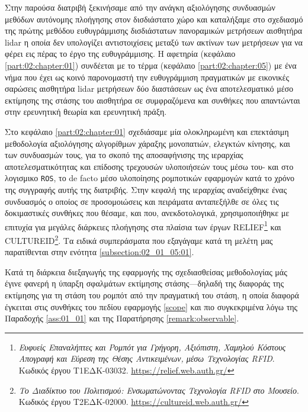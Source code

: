 Στην παρούσα διατριβή ξεκινήσαμε από την ανάγκη αξιολόγησης συνδυασμών μεθόδων
αυτόνομης πλοήγησης στον δισδιάστατο χώρο και καταλήξαμε στο σχεδιασμό της
πρώτης μεθόδου ευθυγράμμισης δισδιάστατων πανοραμικών μετρήσεων αισθητήρα lidar
η οποία δεν υπολογίζει αντιστοιχίσεις μεταξύ των ακτίνων των μετρήσεων για να
φέρει εις πέρας το έργο της ευθυγράμμισης. Η αφετηρία (κεφάλαιο
\ref{part:02:chapter:01}) συνδέεται με το τέρμα (κεφάλαιο
\ref{part:02:chapter:05}) με ένα νήμα που έχει ως κοινό παρονομαστή την
ευθυγράμμιση πραγματικών με εικονικές σαρώσεις αισθητήρα lidar μετρήσεων δύο
διαστάσεων ως ένα αποτελεσματικό μέσο εκτίμησης της στάσης του αισθητήρα σε
συμφραζόμενα και συνθήκες που απαντώνται στην ερευνητική θεωρία και ερευνητική
πράξη.

Στο κεφάλαιο \ref{part:02:chapter:01} σχεδιάσαμε μία ολοκληρωμένη και
επεκτάσιμη μεθοδολογία αξιολόγησης αλγορίθμων χάραξης μονοπατιών, ελεγκτών
κίνησης, και των συνδυασμών τους, για το σκοπό της αποσαφήνισης της ιεραρχίας
αποτελεσματικότητας και επίδοσης τρεχουσών υλοποιήσεών τους μέσω του- και στο
λογισμικο \texttt{ROS}, το de facto μέσο υλοποίησης ρομποτικών εφαρμογών κατά
το χρόνο της συγγραφής αυτής της διατριβής. Στην κεφαλή της ιεραρχίας
αναδείχθηκε ένας συνδυασμός ο οποίος σε προσομοιώσεις και πειράματα ανταπεξήλθε
σε όλες τις δοκιμαστικές συνθήκες που θέσαμε, και που, ανεκδοτολογικά,
χρησιμοποιήθηκε με επιτυχία για μεγάλες διάρκειες πλοήγησης στα πλαίσια των
έργων RELIEF\footnote{\textit{Ευφυείς Επαναλήπτες και Ρομπότ για Γρήγορη,
Αξιόπιστη, Χαμηλού Κόστους Απογραφή και Εύρεση της Θέσης Αντικειμένων, μέσω
Τεχνολογίας RFID}. Κωδικός έργου Τ1ΕΔΚ-03032.
\url{https://relief.web.auth.gr/}} και CULTUREID\footnote{\textit{Το Διαδίκτυο
του Πολιτισμού: Ενσωματώνοντας Τεχνολογία RFID στο Μουσείο}. Κωδικός έργου
Τ2ΕΔΚ-02000. \url{https://cultureid.web.auth.gr/}}. Τα ειδικά συμπεράσματα που
εξαγάγαμε κατά τη μελέτη μας παρατίθενται στην ενότητα
\ref{subsection:02_01_05:01}.

Κατά τη διάρκεια διεξαγωγής της εφαρμογής της σχεδιασθείσας μεθοδολογίας μάς
έγινε φανερή η ύπαρξη σφαλμάτων εκτίμησης στάσης---δηλαδή της διαφοράς της
εκτίμησης για τη στάση του ρομπότ από την πραγματική του στάση, η οποία διαφορά
έγκειται στις συνθήκες του πεδίου εφαρμογής \ref{scope} και πιο συγκεκριμένα
λόγω της Παραδοχής \ref{ass:01_01} και της Παρατήρησης \ref{remark:observable}.

